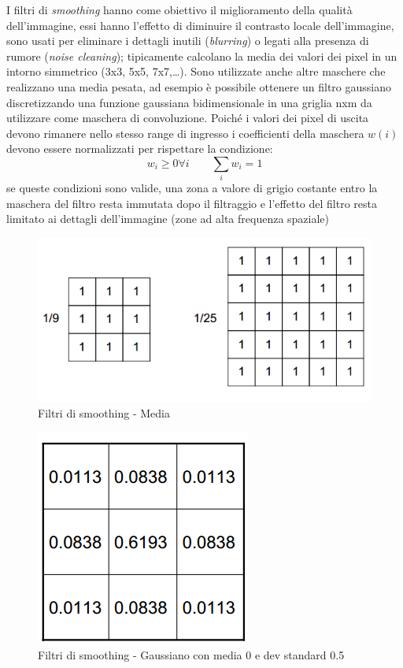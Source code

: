 I filtri di \emph{smoothing} hanno come obiettivo il miglioramento della qualità 
dell'immagine, essi hanno l'effetto di diminuire il contrasto locale 
dell'immagine, sono usati per eliminare i  dettagli inutili (\emph{blurring}) o legati alla presenza 
di rumore (\emph{noise cleaning}); tipicamente calcolano la media dei valori dei pixel in un 
intorno simmetrico (3x3, 5x5, 7x7,…).
Sono utilizzate anche altre maschere che realizzano una media pesata, ad esempio è
possibile ottenere un filtro gaussiano discretizzando una funzione gaussiana bidimensionale
in una griglia nxm da utilizzare come maschera di convoluzione. Poiché i valori dei pixel
di uscita devono rimanere nello stesso range di ingresso i coefficienti della maschera $w(i)$ devono
essere normalizzati per rispettare la condizione:
\[
	w_i \geq 0 \forall i \qquad  	\sum_{i} w_i =1
\]
se queste condizioni sono valide, una zona a valore di grigio 
costante entro la maschera del filtro resta immutata 
dopo il filtraggio e l'effetto del filtro resta limitato ai 
dettagli dell'immagine (zone ad alta frequenza spaziale)
\begin{figure}[!h]
\centering
\includegraphics[width=.8\textwidth]{img/kernel-media.png}
\caption{Filtri di smoothing - Media}
\label{fig:kernel-media}
\end{figure}
\begin{figure}[!h]
\centering
\includegraphics[width=.3\textwidth]{img/kernel-gaussiana.png}
\caption{Filtri di smoothing - Gaussiano con media 0 e dev standard 0.5}
\label{fig:kernel-gaussiana}
\end{figure}
